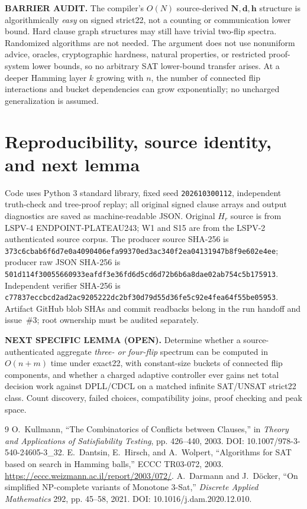\documentclass[10pt]{article}
\newcommand{\bd}{\mathbf d}
\newcommand{\bh}{\mathbf h}
\begin{document}
\noindent\textbf{BARRIER AUDIT.} The compiler's $O(N)$ source-derived $\mathbf N,\bd,\bh$ structure is algorithmically \emph{easy} on signed strict22, not a counting or communication lower bound. Hard clause graph structures may still have trivial two-flip spectra. Randomized algorithms are not needed. The argument does not use nonuniform advice, oracles, cryptographic hardness, natural properties, or restricted proof-system lower bounds, so no arbitrary SAT lower-bound transfer arises. At a deeper Hamming layer $k$ growing with $n$, the number of connected flip interactions and bucket dependencies can grow exponentially; no uncharged generalization is assumed.

\section{Reproducibility, source identity, and next lemma}
Code uses Python 3 standard library, fixed seed \texttt{202610300112}, independent truth-check and tree-proof replay; all original signed clause arrays and output diagnostics are saved as machine-readable JSON. Original $H_r$ source is from LSPV-4 ENDPOINT-PLATEAU243; W1 and S15 are from the LSPV-2 authenticated source corpus. The producer source SHA-256 is \texttt{373c6cbab6f6d7e0a4090406efa99370ed3ac340f2ea04131947b8f9e602e4ee}; producer raw JSON SHA-256 is \texttt{501d114f30055660933eafdf3e36fd6d5cd6d72b6b6a8dae02ab754c5b175913}. Independent verifier SHA-256 is \texttt{c77837eccbcd2ad2ac9205222dc2bf30d79d55d36fe5c92e4fea64f55be05953}. Artifact GitHub blob SHAs and commit readbacks belong in the run handoff and issue~\#3; root ownership must be audited separately.\par
\noindent\textbf{NEXT SPECIFIC LEMMA (OPEN).} Determine whether a source-authenticated aggregate \emph{three- or four-flip} spectrum can be computed in $O(n+m)$ time under exact22, with constant-size buckets of connected flip components, and whether a charged adaptive controller ever gains net total decision work against DPLL/CDCL on a matched infinite SAT/UNSAT strict22 class. Count discovery, failed choices, compatibility joins, proof checking and peak space.\par
\begin{thebibliography}{9}
 O.~Kullmann, ``The Combinatorics of Conflicts between Clauses,'' in \emph{Theory and Applications of Satisfiability Testing}, pp. 426--440, 2003. DOI: 10.1007/978-3-540-24605-3\_32.
 E.~Dantsin, E.~Hirsch, and A.~Wolpert, ``Algorithms for SAT based on search in Hamming balls,'' ECCC TR03-072, 2003. \url{https://eccc.weizmann.ac.il/report/2003/072/}.
 A.~Darmann and J.~D\"ocker, ``On simplified NP-complete variants of Monotone 3-Sat,'' \emph{Discrete Applied Mathematics} 292, pp. 45--58, 2021. DOI: 10.1016/j.dam.2020.12.010.
\end{thebibliography}
\end{document}

